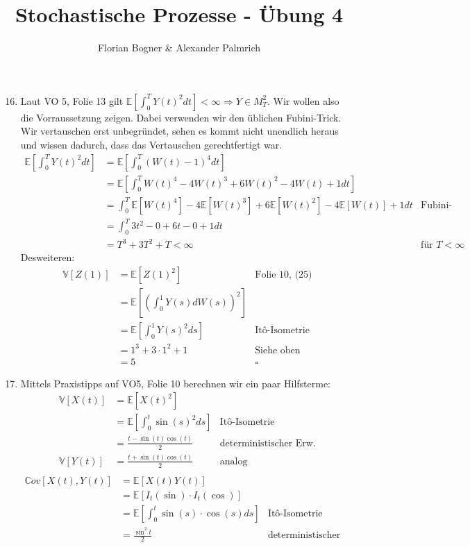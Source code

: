 \documentclass[a4paper,11pt,notitlepage,fullpage]{article}
\newcommand{\Ee}[1]{\mathbb E\left[#1\right]}
\newcommand{\Vv}[1]{\mathbb V\left[#1\right]}
\newcommand{\Cov}[1]{\mathbb Cov\left[#1\right]}
\begin{document}
\author{Florian Bogner \& Alexander Palmrich}
\title{Stochastische Prozesse - Übung 4}
\maketitle

\begin{enumerate}
\setcounter{enumi}{15}

\item Laut VO 5, Folie 13 gilt $\Ee{\int_0^T Y(t)^2 dt} < \infty \Rightarrow Y \in M_T^2$. Wir wollen also die Vorraussetzung zeigen. Dabei verwenden wir den üblichen Fubini-Trick. Wir vertauschen erst unbegründet, sehen es kommt nicht unendlich heraus und wissen dadurch, dass das Vertauschen gerechtfertigt war.
\begin{align*}
\Ee{\int_0^T Y(t)^2 dt} &= \Ee{\int_0^T (W(t)-1)^4 dt} \\
&= \Ee{\int_0^T W(t)^4 - 4W(t)^3 + 6W(t)^2 - 4W(t) + 1 dt} \\
&= \int_0^T \Ee{W(t)^4} - 4\Ee{W(t)^3} + 6\Ee{W(t)^2} - 4\Ee{W(t)} + 1 dt &\text{Fubini-Trick} \\
&= \int_0^T 3t^2 - 0 + 6t - 0 + 1 dt \\
&= T^3 + 3T^2 + T < \infty &\text{für $T < \infty$}
\end{align*}
Desweiteren:
\begin{align*}
\Vv{Z(1)} &= \Ee{Z(1)^2} &\text{Folie 10, (25)} \\
&= \Ee{\left(\int_0^1 Y(s) dW(s)  \right)^2} \\
&= \Ee{\int_0^1 Y(s)^2  ds} &\text{Itô-Isometrie} \\
&= 1^3 + 3\cdot1^2 + 1  &\text{Siehe oben} \\
&= 5 &\square
\end{align*}


\item Mittels Praxistipps auf VO5, Folie 10 berechnen wir ein paar Hilfsterme:
\begin{align*}
\Vv{X(t)} &= \Ee{X(t)^2} \\
&= \Ee{\int_0^t \sin(s)^2 ds} &\text{Itô-Isometrie} \\
&= \frac{t-\sin(t)\cos(t)}{2} &\text{deterministischer Erw.} \\
\Vv{Y(t)} &= \frac{t+\sin(t)\cos(t)}{2} &\text{analog}\\
\end{align*}
\begin{align*}
\Cov{X(t), Y(t)} &= \Ee{X(t) Y(t)}\\
&= \Ee{I_t (\sin) \cdot I_t (\cos)}\\
&= \Ee{\int_0^t \sin(s) \cdot \cos(s) ds}&\text{Itô-Isometrie} \\
&= \frac{\sin^2t}{2} &\text{deterministischer Erw.} \\
\end{align*}


\end{enumerate}
\end{document}
